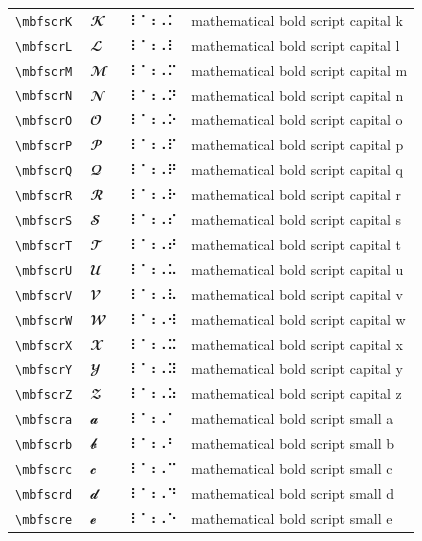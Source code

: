\documentclass[oneside]{article}
\begin{document}
\begin{longtable}{llll}
\verb|\mbfscrK| & $\mbfscrK$ &  ⠸⠈⠰⠠⠅  & {mathematical bold script capital k} \\[2ex]
\verb|\mbfscrL| & $\mbfscrL$ &  ⠸⠈⠰⠠⠇  & {mathematical bold script capital l} \\[2ex]
\verb|\mbfscrM| & $\mbfscrM$ &  ⠸⠈⠰⠠⠍  & {mathematical bold script capital m} \\[2ex]
\verb|\mbfscrN| & $\mbfscrN$ &  ⠸⠈⠰⠠⠝  & {mathematical bold script capital n} \\[2ex]
\verb|\mbfscrO| & $\mbfscrO$ &  ⠸⠈⠰⠠⠕  & {mathematical bold script capital o} \\[2ex]
\verb|\mbfscrP| & $\mbfscrP$ &  ⠸⠈⠰⠠⠏  & {mathematical bold script capital p} \\[2ex]
\verb|\mbfscrQ| & $\mbfscrQ$ &  ⠸⠈⠰⠠⠟  & {mathematical bold script capital q} \\[2ex]
\verb|\mbfscrR| & $\mbfscrR$ &  ⠸⠈⠰⠠⠗  & {mathematical bold script capital r} \\[2ex]
\verb|\mbfscrS| & $\mbfscrS$ &  ⠸⠈⠰⠠⠎  & {mathematical bold script capital s} \\[2ex]
\verb|\mbfscrT| & $\mbfscrT$ &  ⠸⠈⠰⠠⠞  & {mathematical bold script capital t} \\[2ex]
\verb|\mbfscrU| & $\mbfscrU$ &  ⠸⠈⠰⠠⠥  & {mathematical bold script capital u} \\[2ex]
\verb|\mbfscrV| & $\mbfscrV$ &  ⠸⠈⠰⠠⠧  & {mathematical bold script capital v} \\[2ex]
\verb|\mbfscrW| & $\mbfscrW$ &  ⠸⠈⠰⠠⠺  & {mathematical bold script capital w} \\[2ex]
\verb|\mbfscrX| & $\mbfscrX$ &  ⠸⠈⠰⠠⠭  & {mathematical bold script capital x} \\[2ex]
\verb|\mbfscrY| & $\mbfscrY$ &  ⠸⠈⠰⠠⠽  & {mathematical bold script capital y} \\[2ex]
\verb|\mbfscrZ| & $\mbfscrZ$ &  ⠸⠈⠰⠠⠵  & {mathematical bold script capital z} \\[2ex]
\verb|\mbfscra| & $\mbfscra$ &  ⠸⠈⠰⠠⠁  & {mathematical bold script small a} \\[2ex]
\verb|\mbfscrb| & $\mbfscrb$ &  ⠸⠈⠰⠠⠃  & {mathematical bold script small b} \\[2ex]
\verb|\mbfscrc| & $\mbfscrc$ &  ⠸⠈⠰⠠⠉  & {mathematical bold script small c} \\[2ex]
\verb|\mbfscrd| & $\mbfscrd$ &  ⠸⠈⠰⠠⠙  & {mathematical bold script small d} \\[2ex]
\verb|\mbfscre| & $\mbfscre$ &  ⠸⠈⠰⠠⠑  & {mathematical bold script small e} \\[2ex]

\end{longtable}
\end{document}
